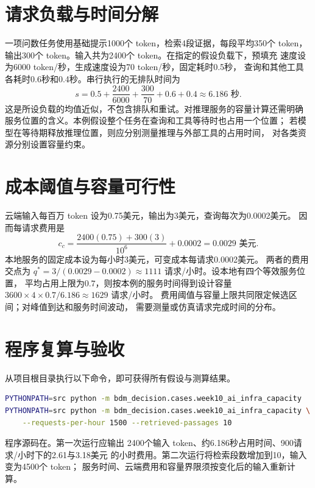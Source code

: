 \section{请求负载与时间分解}
一项问数任务使用基础提示1000个 token，检索4段证据，每段平均350个 token，
输出300个 token。输入共为2400个 token。在指定的假设负载下，预填充
速度设为6000 token/秒，生成速度设为70 token/秒，固定耗时0.5秒，
查询和其他工具各耗时0.6秒和0.4秒。串行执行的无排队时间为
\[
s=0.5+\frac{2400}{6000}+\frac{300}{70}+0.6+0.4
 \approx 6.186\text{ 秒}.
\]
这是所设负载的均值近似，不包含排队和重试。对推理服务的容量计算还需明确
服务位置的含义。本例假设整个任务在查询和工具等待时也占用一个位置；
若模型在等待期释放推理位置，则应分别测量推理与外部工具的占用时间，
对各类资源分别设置容量约束。

\section{成本阈值与容量可行性}
云端输入每百万 token 设为0.75美元，输出为3美元，查询每次为0.0002美元。
因而每请求费用是
\[
c_c=\frac{2400(0.75)+300(3)}{10^6}+0.0002
=0.0029\text{ 美元}.
\]
本地服务的固定成本设为每小时3美元，可变成本每请求0.0002美元。
两者的费用交点为
\(q^*=3/(0.0029-0.0002)\approx1111\) 请求/小时。设本地有四个等效服务位置，
平均占用上限为\(0.7\)，则按本例的服务时间得到设计容量
\(3600\times4\times0.7/6.186\approx1629\) 请求/小时。
费用阈值与容量上限共同限定候选区间；对峰值到达和服务时间波动，
需要测量或仿真请求完成时间的分布。

\section{程序复算与验收}
从项目根目录执行以下命令，即可获得所有假设与测算结果。
\begin{lstlisting}[language=bash,caption={模型服务容量案例的执行命令}]
PYTHONPATH=src python -m bdm_decision.cases.week10_ai_infra_capacity
PYTHONPATH=src python -m bdm_decision.cases.week10_ai_infra_capacity \
    --requests-per-hour 1500 --retrieved-passages 10
\end{lstlisting}
程序源码在。第一次运行应输出
2400个输入 token、约6.186秒占用时间、900请求/小时下的2.61与3.18美元
的小时费用。第二次运行将检索段数增加到10，输入变为4500个 token；
服务时间、云端费用和容量界限须按变化后的输入重新计算。

